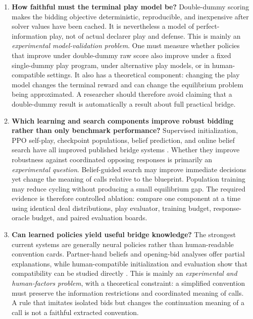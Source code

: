\documentclass[11pt]{article}
\begin{document}
\begin{enumerate}
    \item \textbf{How faithful must the terminal play model be?} Double-dummy scoring makes the bidding objective deterministic, reproducible, and inexpensive after solver values have been cached. It is nevertheless a model of perfect-information play, not of actual declarer play and defense. This is mainly an \emph{experimental model-validation problem}. One must measure whether policies that improve under double-dummy raw score also improve under a fixed single-dummy play program, under alternative play models, or in human-compatible settings. It also has a theoretical component: changing the play model changes the terminal reward and can change the equilibrium problem being approximated. A researcher should therefore avoid claiming that a double-dummy result is automatically a result about full practical bridge.

    \item \textbf{Which learning and search components improve robust bidding rather than only benchmark performance?} Supervised initialization, PPO self-play, checkpoint populations, belief prediction, and online belief search have all improved published bridge systems \cite{qiu2024bridge,kita2024simple,zhang2025diverse}. Whether they improve robustness against coordinated opposing responses is primarily an \emph{experimental question}. Belief-guided search may improve immediate decisions yet change the meaning of calls relative to the blueprint. Population training may reduce cycling without producing a small equilibrium gap. The required evidence is therefore controlled ablation: compare one component at a time using identical deal distributions, play evaluator, training budget, response-oracle budget, and paired evaluation boards.

    \item \textbf{Can learned policies yield useful bridge knowledge?} The strongest current systems are generally neural policies rather than human-readable convention cards. Partner-hand beliefs and opening-bid analyses offer partial explanations, while human-compatible initialization and evaluation show that compatibility can be studied directly \cite{rong2019competitive,qiu2024bridge,lockhart2020human}. This is mainly an \emph{experimental and human-factors problem}, with a theoretical constraint: a simplified convention must preserve the information restrictions and coordinated meaning of calls. A rule that imitates isolated bids but changes the continuation meaning of a call is not a faithful extracted convention.
\end{enumerate}
\end{document}
